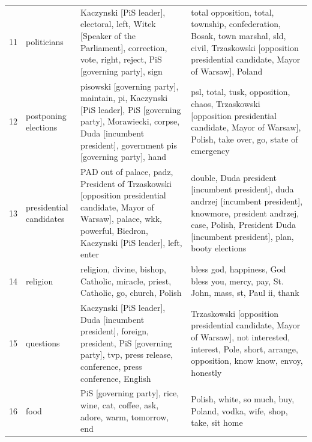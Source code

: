 \documentclass{article}
\begin{document}
\begin{otherlanguage}{polish}
\begin{longtable}{p{2cm}p{2cm}p{5cm}p{5cm}}
	11 &              politicians &                                          Kaczynski [PiS leader], electoral, left, Witek [Speaker of the Parliament], correction, vote, right, reject, PiS [governing party], sign &                                      total opposition, total, township, confederation, Bosak, town marshal, sld, civil, Trzaskowski [opposition presidential candidate, Mayor of Warsaw], Poland \\
	12 &     postponing elections &   pisowski [governing party], maintain, pi, Kaczynski [PiS leader], PiS [governing party], Morawiecki, corpse, Duda [incumbent president], government pis [governing party], hand &                                                 psl, total, tusk, opposition, chaos, Trzaskowski [opposition presidential candidate, Mayor of Warsaw], Polish, take over, go, state of emergency \\
	13 &  presidential candidates &       PAD out of palace, padz, President of Trzaskowski [opposition presidential candidate, Mayor of Warsaw], palace, wkk, powerful, Biedron, Kaczynski [PiS leader], left, enter &         double, Duda president [incumbent president], duda andrzej [incumbent president], knowmore, president andrzej, case, Polish, President Duda [incumbent president], plan, booty elections \\
	14 &                 religion &                                                                                                 religion, divine, bishop, Catholic, miracle, priest, Catholic, go, church, Polish &                                                                                                              bless god, happiness, God bless you, mercy, pay, St. John, mass, st, Paul ii, thank \\
	15 &                questions &                          Kaczynski [PiS leader], Duda [incumbent president], foreign, president, PiS [governing party], tvp, press release, conference, press conference, English &                                         Trzaskowski [opposition presidential candidate, Mayor of Warsaw], not interested, interest, Pole, short, arrange, opposition, know know, envoy, honestly \\
	16 &                     food &                                                                                                   PiS [governing party], rice, wine, cat, coffee, ask, adore, warm, tomorrow, end &                                                                                                                           Polish, white, so much, buy, Poland, vodka, wife, shop, take, sit home \\

\end{longtable}
\end{otherlanguage}
\end{document}
